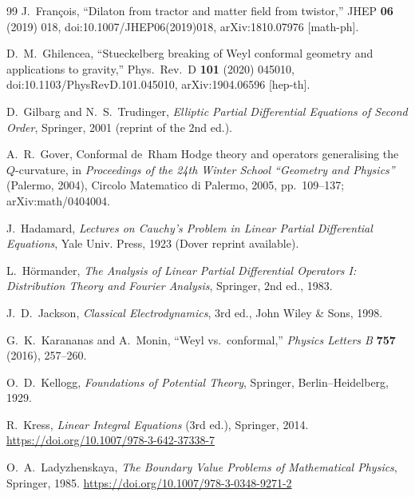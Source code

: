 \documentclass[preprint,12pt]{elsarticle}
\theoremstyle{plain}
\theoremstyle{definition}
\theoremstyle{note}
\begin{document}
\begin{thebibliography}{99}
J.~Fran{\c c}ois,
\newblock ``Dilaton from tractor and matter field from twistor,''
\newblock JHEP \textbf{06} (2019) 018,
\newblock doi:10.1007/JHEP06(2019)018,
\newblock arXiv:1810.07976 [math-ph].

D.~M.~Ghilencea,
\newblock ``Stueckelberg breaking of Weyl conformal geometry and applications to gravity,''
\newblock Phys.\ Rev.\ D \textbf{101} (2020) 045010,
\newblock doi:10.1103/PhysRevD.101.045010,
\newblock arXiv:1904.06596 [hep-th].

D.~Gilbarg and N.~S.~Trudinger,
\newblock \emph{Elliptic Partial Differential Equations of Second Order},
\newblock Springer, 2001 (reprint of the 2nd ed.).

A.~R.~Gover,
\newblock Conformal de~Rham Hodge theory and operators generalising the $Q$-curvature,
\newblock in \emph{Proceedings of the 24th Winter School ``Geometry and Physics''} (Palermo, 2004),
\newblock Circolo Matematico di Palermo, 2005, pp.~109--137; arXiv:math/0404004.

J.~Hadamard,
\newblock \emph{Lectures on Cauchy's Problem in Linear Partial Differential Equations},
\newblock Yale Univ. Press, 1923 (Dover reprint available).

L.~H{\"o}rmander,
\newblock \emph{The Analysis of Linear Partial Differential Operators I: Distribution Theory and Fourier Analysis},
\newblock Springer, 2nd ed., 1983.

J.~D.~Jackson,
\newblock \emph{Classical Electrodynamics}, 3rd ed.,
\newblock John Wiley \& Sons, 1998.

G.~K.~Karananas and A.~Monin,
\newblock ``Weyl vs.\ conformal,''
\newblock \emph{Physics Letters B} \textbf{757} (2016), 257--260.

O.~D.~Kellogg,
\newblock \emph{Foundations of Potential Theory},
\newblock Springer, Berlin--Heidelberg, 1929.

R.~Kress,
\newblock \emph{Linear Integral Equations} (3rd ed.),
\newblock Springer, 2014.
\newblock \url{https://doi.org/10.1007/978-3-642-37338-7}

O.~A.~Ladyzhenskaya,
\newblock \emph{The Boundary Value Problems of Mathematical Physics},
\newblock Springer, 1985.
\newblock \url{https://doi.org/10.1007/978-3-0348-9271-2}


\end{thebibliography}
\end{document}
